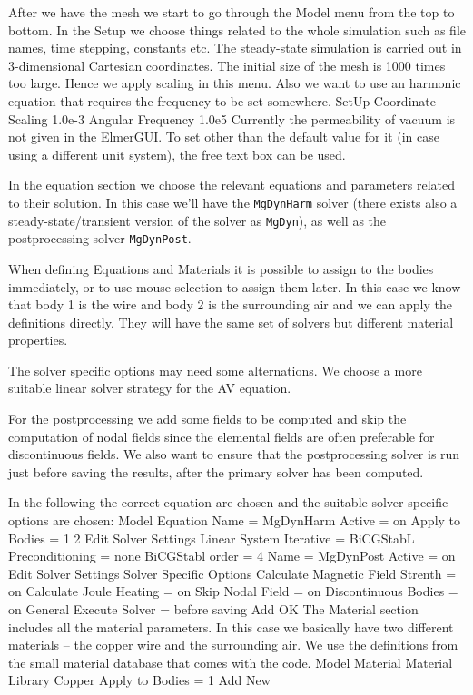After we have the mesh we start to go through the Model menu from the top to bottom. 
In the Setup we choose things related to the whole simulation such as file names, 
time stepping, constants etc.
The steady-state simulation is carried out in 3-dimensional Cartesian
coordinates. The initial size of the mesh is 1000 times too large. Hence we apply scaling in this menu.
Also we want to use an harmonic equation that requires the frequency to be set somewhere. 
\ttbegin
SetUp
  Coordinate Scaling 
    1.0e-3
  Angular Frequency
    1.0e5   
\ttend
Currently the permeability of vacuum is not given
in the ElmerGUI. To set other than the default value for it (in case using a different unit system),
the free text box can be used.

In the equation section we choose the relevant equations and parameters related to their solution. 
In this case we'll have the \texttt{MgDynHarm} solver (there exists also a steady-state/transient version of the solver
as \texttt{MgDyn}), as well as the postprocessing solver \texttt{MgDynPost}.

When defining Equations and Materials it is possible to assign to the bodies immediately, or to use mouse
selection to assign them later. In this case we know that body 1 is the wire and body 2 is the surrounding air and we
can apply the definitions directly.
They will have the same set of solvers but different material properties. 

The solver specific options may need some alternations. We choose a more suitable
linear solver strategy for the AV equation. 

For the postprocessing we add some fields to be computed and skip the computation of nodal fields since the
elemental fields are often preferable for discontinuous fields. 
We also want to ensure that the postprocessing solver is run just before saving the results, after the primary solver has been computed.

In the following the correct equation are chosen and the suitable solver specific options are chosen:
\ttbegin
Model
  Equation
    Name = MgDynHarm
      Active = on
      Apply to Bodies = 1 2  
      Edit Solver Settings
        Linear System
          Iterative = BiCGStabL
        Preconditioning = none
        BiCGStabl order = 4    
    Name = MgDynPost
      Active = on
      Edit Solver Settings
        Solver Specific Options
          Calculate Magnetic Field Strenth = on
          Calculate Joule Heating = on
          Skip Nodal Field = on
          Discontinuous Bodies = on
        General
          Execute Solver = before saving   
    Add 
    OK
\ttend        
The Material section includes all the material parameters. In this case we basically have two 
different materials -- the copper wire and the surrounding air.
We use the definitions from the small material database that comes with the code.
\ttbegin
Model
  Material
    Material Library
      Copper
    Apply to Bodies = 1
    Add
    New

